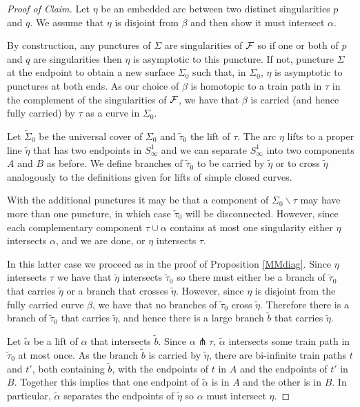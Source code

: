 \documentclass[11pt]{article}
\theoremstyle{remark}
\newcommand{\cF}{{\cal F}}
\begin{document}
\begin{proof} [Proof of Claim]
Let $\eta$ be an embedded arc between two distinct singularities $p$ and $q$. We assume that $\eta$ is disjoint from $\beta$ and then show it must intersect $\alpha$.

By construction, any punctures of $\Sigma$ are singularities of $\cF$ so if one or both of $p$ and $q$ are singularities then $\eta$ is asymptotic to this puncture. If not, puncture $\Sigma$ at the endpoint to obtain a new surface $\Sigma_0$ such that, in $\Sigma_0$, $\eta$ is asymptotic to punctures at both ends. As our choice of $\beta$ is homotopic to a train path in $\tau$ in the complement of the singularities of $\cF$, we have that $\beta$ is carried (and hence fully carried) by $\tau$ as a curve in $\Sigma_0$.

 Let $\tilde\Sigma_0$ be the universal cover of $\Sigma_0$ and $\tilde\tau_0$ the lift of $\tau$.  The arc $\eta$ lifts to a proper line $\tilde\eta$ that has two endpoints in $S^1_\infty$ and we can separate $S^1_\infty$ into two components $A$ and $B$ as before. We define branches of $\tilde\tau_0$ to be carried by $\tilde \eta$ or to cross $\tilde\eta$ analogously to the definitions given for lifts of simple closed curves.
 
 With the additional punctures it may be that a component of $\Sigma_0\smallsetminus \tau$ may have more than one puncture, in which case $\tilde\tau_0$ will be disconnected. However, since each complementary component $\tau \cup \alpha$ contains at most one singularity either $\eta$ intersects $\alpha$, and we are done, or $\eta$ intersects $\tau$.

In this latter case we proceed as in the proof of Proposition \ref{MMdiag}. Since $\eta$ intersects $\tau$ we have that $\tilde\eta$ intersects $\tilde\tau_0$ so there must either be a branch of $\tilde\tau_0$ that carries $\tilde\eta$ or a branch that  crosses $\tilde\eta$. However, since $\eta$ is disjoint from the fully carried curve $\beta$, we have that no branches of $\tilde\tau_0$ cross $\tilde\eta$. Therefore there is a branch of $\tilde\tau_0$ that carries $\tilde\eta$, and hence there is a large branch $\tilde b$ that carries $\tilde\eta$.

Let $\tilde\alpha$ be a lift of $\alpha$ that intersects $\tilde b$. Since $\alpha \pitchfork \tau$, $\tilde\alpha$ intersects some train path in $\tilde\tau_0$ at most once. As the branch $\tilde b$ is carried by $\tilde\eta$, there are bi-infinite train paths $t$ and $t'$, both containing $\tilde b$, with the endpoints of $t$ in $A$ and the endpoints of $t'$ in $B$. Together this implies that one endpoint of $\tilde\alpha$ is in $A$ and the other is in $B$. In particular, $\tilde\alpha$ separates the endpoints of $\tilde\eta$ so $\alpha$ must intersect $\eta$.
\end{proof}
\end{document}
